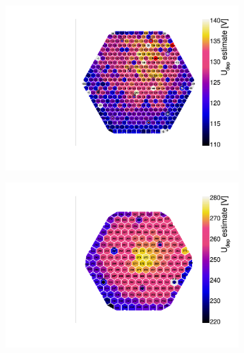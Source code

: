 \begin{figure}
	\captionsetup[subfigure]{aboveskip=-1pt,belowskip=-1pt}
	\centering
	\begin{subfigure}[b]{0.32\textwidth}
		\centering
		\includegraphics[width=0.99\textwidth]{plots/Vdep_hexplots/3009.pdf}
		\subcaption{
		}
		\label{plot:Vdep_hexplot_3009}
	\end{subfigure}	
	\hfill	
	\begin{subfigure}[b]{0.32\textwidth}
		\centering
		\includegraphics[width=0.99\textwidth]{plots/Vdep_hexplots/0541_04.pdf}
		\subcaption{
			}
			\label{plot:Vdep_hexplot_0541_04}
	\end{subfigure}
	\hfill
	\begin{subfigure}[b]{0.32\textwidth}
		\centering

\end{subfigure}
\end{figure}
